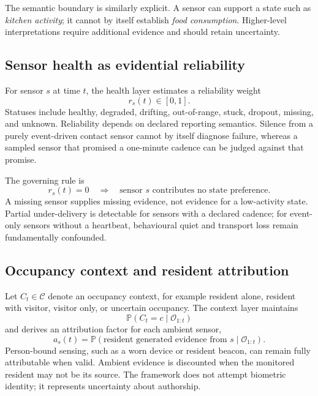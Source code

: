 \documentclass[11pt]{article}
\newcommand{\Prob}{\mathbb{P}}
\newcommand{\calO}{\mathcal{O}}
\newcommand{\calC}{\mathcal{C}}
\begin{document}
The semantic boundary is similarly explicit. A sensor can support a state such as \emph{kitchen activity}; it cannot by itself establish \emph{food consumption}. Higher-level interpretations require additional evidence and should retain uncertainty.

\subsection{Sensor health as evidential reliability}

For sensor $s$ at time $t$, the health layer estimates a reliability weight
\begin{equation}
    r_s(t)\in[0,1].
\end{equation}
Statuses include healthy, degraded, drifting, out-of-range, stuck, dropout, missing, and unknown. Reliability depends on declared reporting semantics. Silence from a purely event-driven contact sensor cannot by itself diagnose failure, whereas a sampled sensor that promised a one-minute cadence can be judged against that promise.

The governing rule is
\begin{equation}
    r_s(t)=0 \quad \Longrightarrow \quad
    \text{sensor $s$ contributes no state preference}.
\end{equation}
A missing sensor supplies missing evidence, not evidence for a low-activity state. Partial under-delivery is detectable for sensors with a declared cadence; for event-only sensors without a heartbeat, behavioural quiet and transport loss remain fundamentally confounded.

\subsection{Occupancy context and resident attribution}

Let $C_t\in\calC$ denote an occupancy context, for example resident alone, resident with visitor, visitor only, or uncertain occupancy. The context layer maintains
\begin{equation}
    \Prob(C_t=c\mid \calO_{1:t})
\end{equation}
and derives an attribution factor for each ambient sensor,
\begin{equation}
    a_s(t)=\Prob(\text{resident generated evidence from $s$}\mid\calO_{1:t}).
\end{equation}
Person-bound sensing, such as a worn device or resident beacon, can remain fully attributable when valid. Ambient evidence is discounted when the monitored resident may not be its source. The framework does not attempt biometric identity; it represents uncertainty about authorship.
\end{document}
